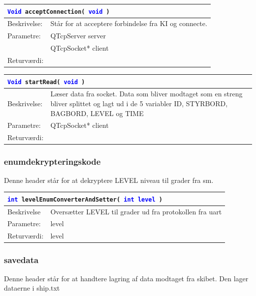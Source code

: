 \begin{table}[H]
\begin{tabular}{l p{12.5cm}}
\multicolumn{2}{l}{\texttt{\textcolor{blue}{Void} acceptConnection( \textcolor{blue}{void} )}} \\
\hline
Beskrivelse:&Står for at acceptere forbindelse fra KI og connecte.\\
Parametre:&QTcpServer server\\
				&QTcpSocket* client\\
Returværdi:&\\
\end{tabular}
\end{table}

\begin{table}[H]
\begin{tabular}{l p{12.5cm}}
\multicolumn{2}{l}{\texttt{\textcolor{blue}{Void} startRead( \textcolor{blue}{void} )}} \\
\hline
Beskrivelse:&Læser data fra socket. Data som bliver modtaget som en streng bliver splittet og lagt ud i de 5 variabler ID, STYRBORD, BAGBORD, LEVEL og TIME\\
Parametre:&QTcpSocket* client\\
Returværdi:&\\
\end{tabular}
\end{table}

\subsubsection{enumdekrypteringskode}
Denne header står for at dekryptere LEVEL niveau til grader fra sm. 

\begin{table}[H]
\begin{tabular}{l p{12.5cm}}
\multicolumn{2}{l}{\texttt{\textcolor{blue}{int} levelEnumConverterAndSetter( \textcolor{blue}{int level} )}} \\
\hline
Beskrivelse & Oversætter LEVEL til grader ud fra protokollen fra uart\\
Parametre: & level\\
Returværdi:& level\\
\end{tabular}
\end{table}



\subsubsection{savedata}
Denne header står for at handtere lagring af data modtaget fra skibet. Den lager dataerne i ship.txt

